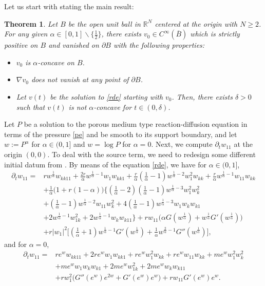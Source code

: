 \documentclass[10pt]{article}         %
\newtheorem{theorem}{Theorem}[section]
\numberwithin{equation}{section}
\begin{document}
Let us start with stating the main result:
\begin{theorem}\label{npc}
Let $B$ be the open unit ball in $\mathbb{R}^N$ centered at the origin with $N\geq 2$. For any given $\alpha\in[0,1]\backslash\{\frac{1}{2}\}$, there exists $v_0\in C^\infty(\overline{B})$ which is strictly positive on $B$ and vanished on $\partial B$ with the following properties:
\begin{itemize}
    \item[(1)] $v_0$ is $\alpha$-concave on $B$.
    \item[(2)] $\nabla v_0$ does not vanish at any point of $\partial B$.
    \item[(3)] Let $v(t)$ be the solution to \eqref{rde} starting with $v_0$. Then, there exists $\delta>0$ such that $v(t)$ is not $\alpha$-concave  for $t\in(0,\delta)$.
\end{itemize}
\end{theorem}

Let $P$ be a solution to the porous medium type reaction-diffusion equation in terms of the pressure \eqref{pe} and be smooth to its support boundary, and let $w:=P^{\alpha}$ for $\alpha\in (0,1]$ and $w=\log P$ for $\alpha=0$. Next, we compute $\partial_t w_{11}$ at the origin $(0,0)$. To deal with the source term, we need to redesign some different initial datum from \cite{CW2024,ST2024}. By means of the equation \eqref{rde}, we have for $\alpha\in (0,1]$,
\begin{equation}\label{partialt11}
\begin{aligned}
    \partial_t w_{11}=&rw^{\frac{1}{\alpha}}w_{kk11}+\frac{2r}{\alpha}w^{\frac{1}{\alpha}-1}w_1w_{kk1}+\frac{r}{\alpha}(\frac{1}{\alpha}-1)w^{\frac{1}{\alpha}-2}w_1^2w_{kk}+\frac{r}{\alpha}w^{\frac{1}{\alpha}-1}w_{11}w_{kk}\\
    &+\frac{1}{\alpha}\big(1+r(1-\alpha)\big)\{(\frac{1}{\alpha}-2)(\frac{1}{\alpha}-1)w^{\frac{1}{\alpha}-3}w_1^2w_k^2\\
    &+(\frac{1}{\alpha}-1)w^{\frac{1}{\alpha}-2}w_{11}w_k^2+4(\frac{1}{\alpha}-1)w^{\frac{1}{\alpha}-3}w_1w_kw_{k1}\\
    &+2w^{\frac{1}{\alpha}-1}w_{1k}^2+2w^{\frac{1}{\alpha}-1}w_kw_{k11}\}+rw_{11}\big(\alpha G(w^{\frac{1}{\alpha}})+w^{\frac{1}{\alpha}}G'(w^{\frac{1}{\alpha}})\big)\\
    &+r|w_1|^2\big[(\frac{1}{\alpha}+1)w^{\frac{1}{\alpha}-1}G'(w^{\frac{1}{\alpha}})+\frac{1}{\alpha}w^{\frac{2}{\alpha}-1}G''(w^{\frac{1}{\alpha}})\big],
\end{aligned}
\end{equation}
and for $\alpha=0$,
\begin{equation}\label{partialt110}
\begin{aligned}
\partial_t w_{11}=&re^ww_{kk11}+2re^{w}w_1w_{kk1}+re^ww_1^2w_{kk}+re^ww_{11}w_{kk}+me^ww_1^2w_k^2\\
&+me^ww_1w_kw_{k1}+2me^ww_{1k}^2+2me^ww_kw_{k11}\\
&+rw_{1}^2\big(G''(e^w)e^{2w}+G'(e^w)e^w\big)+rw_{11} G'(e^w)e^w.
\end{aligned}    
\end{equation}
\end{document}
